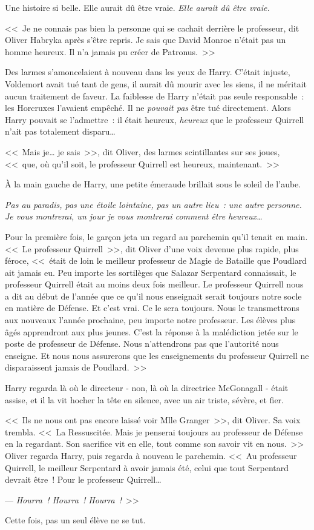 Une histoire si belle. Elle aurait dû être vraie. \emph{Elle aurait dû être vraie.}

<<~Je ne connais pas bien la personne qui se cachait derrière le professeur, dit Oliver Habryka après s'être repris. Je sais que David Monroe n'était pas un homme heureux. Il n'a jamais pu créer de Patronus.~>>

Des larmes s'amoncelaient à nouveau dans les yeux de Harry. C'était injuste, Voldemort avait tué tant de gens, il aurait dû mourir avec les siens, il ne méritait aucun traitement de faveur. La faiblesse de Harry n'était pas seule responsable~: les Horcruxes l'avaient empêché. Il ne \emph{pouvait pas} être tué directement. Alors Harry pouvait se l'admettre~: il était heureux, \emph{heureux} que le professeur Quirrell n'ait pas totalement disparu…

<<~Mais je… je sais~>>, dit Oliver, des larmes scintillantes sur ses joues, <<~que, où qu'il soit, le professeur Quirrell est heureux, maintenant.~>>

À la main gauche de Harry, une petite émeraude brillait sous le soleil de l'aube.

\emph{Pas au paradis, pas une étoile lointaine, pas un autre lieu~: une autre personne. Je vous montrerai, un jour je vous montrerai comment être heureux…}

Pour la première fois, le garçon jeta un regard au parchemin qu'il tenait en main. <<~Le professeur Quirrell~>>, dit Oliver d'une voix devenue plus rapide, plus féroce, <<~était de loin le meilleur professeur de Magie de Bataille que Poudlard ait jamais eu. Peu importe les sortilèges que Salazar Serpentard connaissait, le professeur Quirrell était au moins deux fois meilleur. Le professeur Quirrell nous a dit au début de l'année que ce qu'il nous enseignait serait toujours notre socle en matière de Défense. Et c'est vrai. Ce le sera toujours. Nous le transmettrons aux nouveaux l'année prochaine, peu importe notre professeur. Les élèves plus âgés apprendront aux plus jeunes. C'est la réponse à la malédiction jetée sur le poste de professeur de Défense. Nous n'attendrons pas que l'autorité nous enseigne. Et nous nous assurerons que les enseignements du professeur Quirrell ne disparaissent jamais de Poudlard.~>>

Harry regarda là où le directeur - non, là où la directrice McGonagall - était assise, et il la vit hocher la tête en silence, avec un air triste, sévère, et fier.

<<~Ils ne nous ont pas encore laissé voir Mlle Granger~>>, dit Oliver. Sa voix trembla. <<~La Ressuscitée. Mais je penserai toujours au professeur de Défense en la regardant. Son sacrifice vit en elle, tout comme son savoir vit en nous.~>> Oliver regarda Harry, puis regarda à nouveau le parchemin. <<~Au professeur Quirrell, le meilleur Serpentard à avoir jamais été, celui que tout Serpentard devrait être~! Pour le professeur Quirrell…

--- \emph{Hourra~! Hourra~! Hourra~!}~>>

Cette fois, pas un seul élève ne se tut.
